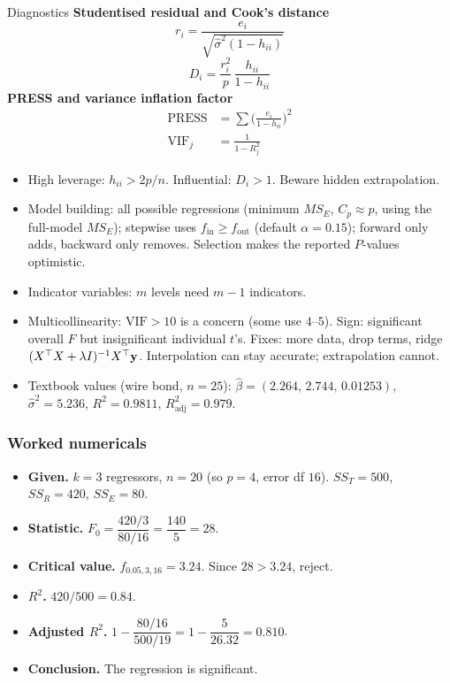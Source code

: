 \begin{formulabox}{Diagnostics}
\textbf{Studentised residual and Cook's distance}
\[ r_i=\frac{e_i}{\sqrt{\hat\sigma^2(1-h_{ii})}} \]
\[ D_i=\frac{r_i^2}{p}\,\frac{h_{ii}}{1-h_{ii}} \]
\textbf{PRESS and variance inflation factor}
\[ \begin{aligned}\mathrm{PRESS}&=\sum\Big(\frac{e_i}{1-h_{ii}}\Big)^2\\ \mathrm{VIF}_j&=\frac1{1-R_j^2}\end{aligned} \]
\end{formulabox}

\begin{notebox}
\begin{itemize}
  \item High leverage: $h_{ii}>2p/n$. Influential: $D_i>1$. Beware hidden extrapolation.
  \item Model building: all possible regressions (minimum $MS_E$, $C_p\approx p$, using the full-model $MS_E$); stepwise uses $f_{\mathrm{in}}\ge f_{\mathrm{out}}$ (default $\alpha=0.15$); forward only adds, backward only removes. Selection makes the reported $P$-values optimistic.
  \item Indicator variables: $m$ levels need $m-1$ indicators.
  \item Multicollinearity: $\mathrm{VIF}>10$ is a concern (some use $4$--$5$). Sign: significant overall $F$ but insignificant individual $t$'s. Fixes: more data, drop terms, ridge $(X^{\top} X+\lambda I)^{-1}X^{\top}\mathbf{y}$. Interpolation can stay accurate; extrapolation cannot.
  \item Textbook values (wire bond, $n=25$): $\hat\beta=(2.264,\,2.744,\,0.01253)$, $\hat\sigma^2=5.236$, $R^2=0.9811$, $R^2_{\mathrm{adj}}=0.979$.
\end{itemize}
\end{notebox}

\subsubsection*{Worked numericals}

\begin{example}
\begin{itemize}
  \item \textbf{Given.} $k=3$ regressors, $n=20$ (so $p=4$, error df $16$). $SS_T=500$, $SS_R=420$, $SS_E=80$.
  \item \textbf{Statistic.} $F_0=\dfrac{420/3}{80/16}=\dfrac{140}{5}=28$.
  \item \textbf{Critical value.} $f_{0.05,3,16}=3.24$. Since $28>3.24$, reject.
  \item \textbf{$R^2$.} $420/500=0.84$.
  \item \textbf{Adjusted $R^2$.} $1-\dfrac{80/16}{500/19}=1-\dfrac{5}{26.32}=0.810$.
  \item \textbf{Conclusion.} The regression is significant.
\end{itemize}
\end{example}

